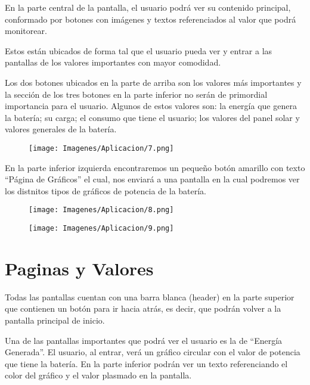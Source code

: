         En la parte central de la pantalla, el usuario podrá ver su contenido principal, conformado por botones con imágenes y textos referenciados al valor que podrá monitorear.\par
        Estos están ubicados de forma tal que el usuario pueda ver y entrar a las pantallas de los valores importantes con mayor comodidad.\par
        Los dos botones ubicados en la parte de arriba son los valores más importantes y la sección de los tres botones en la parte inferior no serán de primordial importancia para el usuario. Algunos de estos valores son: la energía que genera la batería; su carga; el consumo que tiene el usuario; los valores del panel solar y valores generales de la batería.\par

        \begin{figure} [H]
            \centering
            \texttt{[image: Imagenes/Aplicacion/7.png]}
        \end{figure}

        En la parte inferior izquierda encontraremos un pequeño botón amarillo con texto “Página de Gráficos” el cual, nos enviará a una pantalla en la cual podremos ver los distnitos tipos de gráficos de potencia de la batería.\par

        \begin{figure} [H]
            \centering
            \texttt{[image: Imagenes/Aplicacion/8.png]}
        \end{figure}

        \begin{figure} [H]
            \centering
            \texttt{[image: Imagenes/Aplicacion/9.png]}
        \end{figure}

    \section{Paginas y Valores}
        Todas las pantallas cuentan con una barra blanca (header) en la parte superior que contienen un botón para ir hacia atrás, es decir, que podrán volver a la pantalla principal de inicio.\par
        Una de las pantallas importantes que podrá ver el usuario es la de “Energía Generada”. El usuario, al entrar, verá un gráfico circular con el valor de potencia que tiene la batería. En la parte inferior podrán ver un texto referenciando el color del gráfico y el valor plasmado en la pantalla.\par

